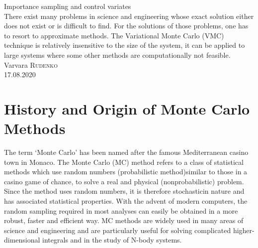 \documentclass{article}
\begin{document}
\begin{center}
\hfill \break
\hfill \break
\hfill\break
\hfill \break
\hfill \break
\hfill \break
\hfill \break
\hfill\break
\hfill \break
\hfill \break
\hfill \break
\large{Importance sampling and control variates}\\
\hfill \break
\hfill \break
\hfill \break
\normalsize{There exist many problems in science and engineering whose exact solution either does not exist or is difficult to find. For the solutions of those problems, one has to resort to approximate methods. The Variational Monte Carlo (VMC) technique is relatively insensitive to the size of the system, it can be applied to large systems where some other methods are computationally not feasible.}\\
\hfill \break
\hfill \break
\hfill \break
\hfill \break
\hfill \break
\hfill \break
\small{Varvara \textsc{Rudenko}}\\

\hfill \break
\hfill \break
\hfill \break
\hfill \break
\hfill \break
\small{17.08.2020}\\
\thispagestyle{empty}
\end{center}                             

\newpage
\tableofcontents
\newpage

\section{History and Origin of Monte Carlo Methods}
The term ‘Monte Carlo’ has been named after the famous Mediterranean casino town in Monaco. The Monte Carlo (MC) method refers to a class of statistical methods which use random numbers (probabilistic method)similar to those in a casino game of chance, to solve a real and physical (nonprobabilistic) problem.  Since the method uses random numbers, it is therefore stochasticin nature and has associated statistical properties. With the advent of modern computers, the random sampling required in most analyses can easily be obtained in a more robust, faster and efficient way. MC methods are widely used in many areas of science and engineering and are particularly useful for solving complicated higher-dimensional integrals and in the study of N-body systems.
\end{document}
